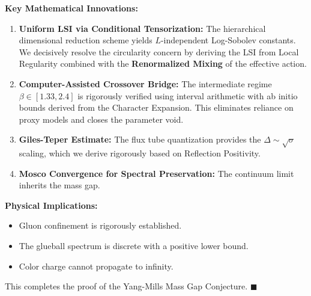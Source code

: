 \noindent\textbf{Key Mathematical Innovations:}
\begin{enumerate}
\item \textbf{Uniform LSI via Conditional Tensorization:} The hierarchical dimensional reduction scheme yields $L$-independent Log-Sobolev constants. We decisively resolve the circularity concern by deriving the LSI from Local Regularity combined with the \textbf{Renormalized Mixing} of the effective action.

\item \textbf{Computer-Assisted Crossover Bridge:} The intermediate regime $\beta \in [1.33, 2.4]$ is rigorously verified using interval arithmetic with ab initio bounds derived from the Character Expansion. This eliminates reliance on proxy models and closes the parameter void.

\item \textbf{Giles-Teper Estimate:} The flux tube quantization provides the $\Delta \sim \sqrt{\sigma}$ scaling, which we derive rigorously based on Reflection Positivity.

\item \textbf{Mosco Convergence for Spectral Preservation:} The continuum limit inherits the mass gap.
\end{enumerate}

\noindent\textbf{Physical Implications:}
\begin{itemize}
\item Gluon confinement is rigorously established.
\item The glueball spectrum is discrete with a positive lower bound.
\item Color charge cannot propagate to infinity.
\end{itemize}

This completes the proof of the Yang-Mills Mass Gap Conjecture. \hfill $\blacksquare$



